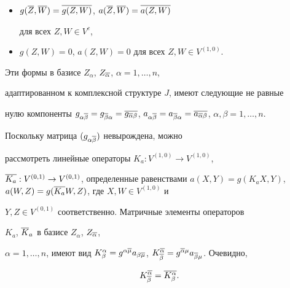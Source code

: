 \begin{itemize}


\item[1)] $g(\overline  Z,\overline W)=\overline{g(Z,W)}$,  $a(\overline Z,\overline W)=\overline{a(Z,W)}$


для всех $Z,W \in V^c$,


\item[2)] $g(Z,W)=0$, $a(Z,W)=0$ для всех $Z,W \in V^{(1,0)}$.


\end{itemize}





Эти формы в базисе $Z_\alpha$, $Z_{\overline\alpha}$, $\alpha=1,\dotsc,n$,


адаптированном к комплексной структуре $J$, имеют следующие не равные


нулю компоненты $g_{\alpha\ol\beta} = g_{\ol\beta\alpha} = \ol


{g_{\ol\alpha\beta}}$, $a_{\alpha\ol\beta} = a_{\ol\beta\alpha} =


\ol {a_{\ol\alpha\beta}}$, $\alpha,\beta=1,\dotsc,n$.





Поскольку матрица $(g_{\alpha\overline\beta})$ невырождена, можно


рассмотреть линейные операторы $K_a: V^{(1,0)}\to V^{(1,0)}$,


$\ol{K_a}: V^{(0,1)} \to V^{(0,1)}$, определенные равенствами $a(X,Y)


= g(K_a X,Y)$, $a(W,Z) = g(\ol{K_a} W,Z)$, где $X, W \in V^{(1,0)}$ и


$Y,Z \in V^{(0,1)}$ соответственно. Матричные элементы операторов


$K_a$, $\overline K_a$ в базисе $Z_\alpha$, $Z_{\overline\alpha}$,


$\alpha=1,\dotsc,n$, имеют вид $K^\alpha_\beta =


g^{\alpha\ol\mu}a_{\beta\ol\mu}$, $K^{\ol\alpha}_{\ol\beta} =


g^{\ol\alpha\mu}a_{\ol\beta\mu}$. Очевидно,


\begin{equation}


\label{2s1-2bis}


K^{\ol\alpha}_{\ol\beta} = \ol{K^\alpha_\beta}.


\end{equation}





